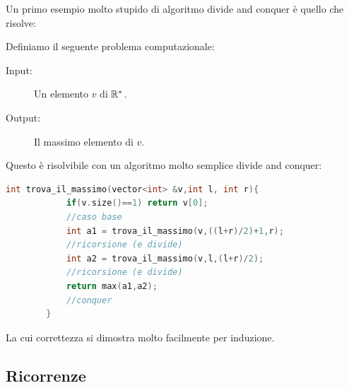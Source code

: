 \documentclass[11pt]{scrartcl}
\begin{document}
	Un primo esempio molto stupido di algoritmo divide and conquer è quello che risolve:
	
	\begin{prob}
		Definiamo il seguente problema computazionale:
		\begin{description}
			\item[Input:] Un elemento $v$ di $\mathbb R^*$.
			\item[Output:] Il massimo elemento di $v$.
		\end{description}
	\end{prob}
	
	Questo è risolvibile con un algoritmo molto semplice divide and conquer:
	\begin{lstlisting}[language=C++]
		int trova_il_massimo(vector<int> &v,int l, int r){
			if(v.size()==1) return v[0]; 					
			//caso base
			int a1 = trova_il_massimo(v,((l+r)/2)+1,r);		
			//ricorsione (e divide)
			int a2 = trova_il_massimo(v,l,(l+r)/2);			
			//ricorsione (e divide)
			return max(a1,a2);								
			//conquer
		}
	\end{lstlisting}
	
	La cui correttezza si dimostra molto facilmente per induzione.
	
	\newpage
	
	\subsection{Ricorrenze}
	
\end{document}
